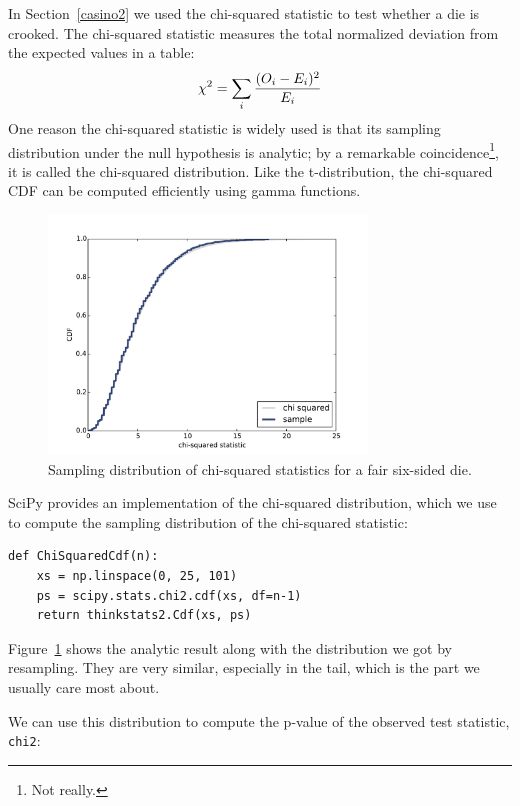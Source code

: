 \documentclass[12pt]{book}
\begin{document}
In Section~\ref{casino2} we used the chi-squared statistic to
test whether a die is crooked.  The chi-squared statistic measures
the total normalized deviation from the expected values in a table:
%
\[ \chi^2 = \sum_i \frac{(O_i - E_i)^2}{E_i} \]
%
One reason the chi-squared statistic is widely used is that
its sampling distribution under the null hypothesis is analytic;
by a remarkable coincidence\footnote{Not really.}, it is called
the chi-squared distribution.  Like the t-distribution, the
chi-squared CDF can be computed efficiently using gamma functions.

\begin{figure}
\centerline{\includegraphics[height=2.5in]{figs/normal5.pdf}}
\caption{Sampling distribution of chi-squared statistics for
a fair six-sided die.}
\label{normal5}
\end{figure}

SciPy provides an implementation of the chi-squared distribution,
which we use to compute the sampling distribution of the
chi-squared statistic:

\begin{verbatim}
def ChiSquaredCdf(n):
    xs = np.linspace(0, 25, 101)
    ps = scipy.stats.chi2.cdf(xs, df=n-1)
    return thinkstats2.Cdf(xs, ps)
\end{verbatim}

Figure~\ref{normal5} shows the analytic result along with the
distribution we got by resampling.  They are very similar,
especially in the tail, which is the part we usually care most
about.

We can use this distribution to compute the p-value of the
observed test statistic, {\tt chi2}:
\end{document}
